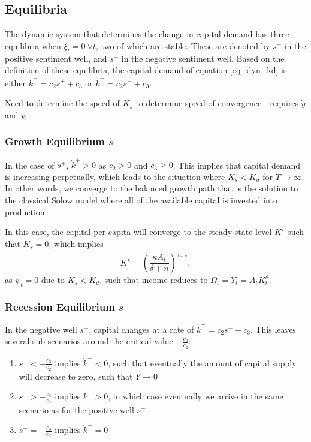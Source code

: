 \documentclass[11pt]{article}
\begin{document}
\subsection{Equilibria}
The dynamic system that determines the change in capital demand has three equilibria when $\xi_t=0~\forall t$, two of which are stable. These are denoted by $s^{+}$ in the positive sentiment well, and $s^{-}$ in the negative sentiment well. Based on the definition of these equilibria, the capital demand of equation \eqref{eq_dyn_kd} is either $\dot{k}^{+} = c_2s^{+} + c_3                                                                                                                                                                                                                                                                       $ or $\dot{k}^{-} = c_2s^{-}+c_3$.

{\color{red} Need to determine the speed of $\dot{K_s}$ to determine speed of convergence - requires $\dot{y}$ and $\dot{\psi}$}

\subsubsection{Growth Equilibrium $s^{+}$}
In the case of $s^{+}$, $\dot{k}^{+}>0$ as $c_2>0$ and $c_3\geq0$. This implies that capital demand is increasing perpetually, which leads to the situation where $K_s<K_d$ for $T\rightarrow\infty$. In other words,  we converge to the balanced growth path that is the solution to the classical Solow model where all of the available capital is invested into production.

In this case, the capital per capita will converge to the steady state level $K^{\star}$ such that $\dot{K}_s=0$, which implies
\begin{equation}\label{eq_steady_k}
K^{\star} = \left(\frac{\kappa A_t}{\delta + n}\right)^{\frac{1}{1-\rho}},
\end{equation}
as $\psi_t=0$ due to $K_s<K_d$, such that income reduces to $\Omega_t=Y_t=A_tK_t^{\rho}$.

\subsubsection{Recession Equilibrium $s^{-}$}
In the negative well $s^{-}$, capital changes at a rate of $\dot{k}^{-} = c_2 s^{-} + c_3$. This leaves several sub-scenarios around the critical value $-\frac{c_3}{c_2}$:
\begin{enumerate}
\item $s^{-} < -\frac{c_3}{c_2}$ implies $\dot{k}^{-}<0$, such that eventually the amount of capital supply will decrease to zero, such that $Y\rightarrow0$
\item $s^{-} > -\frac{c_3}{c_2}$ implies $\dot{k}^{-}>0$, in which case eventually we arrive in the same scenario as for the positive well $s^{+}$
\item $s^{-} = -\frac{c_3}{c_2}$ implies $\dot{k}^{-}=0$
\end{enumerate} 
\end{document}
